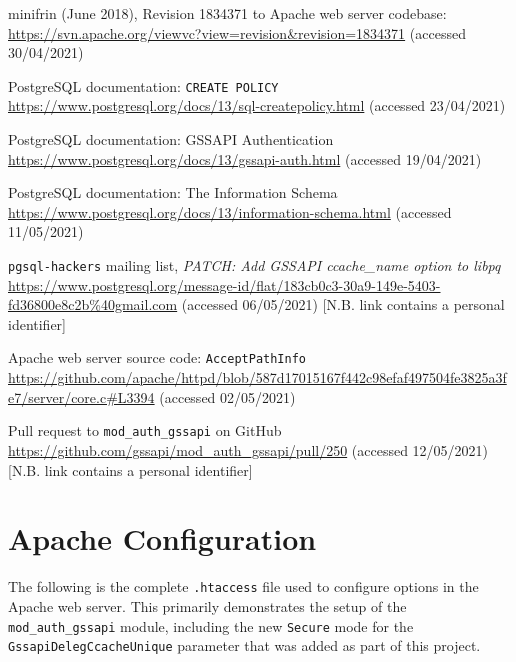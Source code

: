 \documentclass[12pt]{report}
\begin{document}
\begin{thebibliography}{99}
 minifrin (June 2018), Revision 1834371 to Apache web server codebase: \url{https://svn.apache.org/viewvc?view=revision&revision=1834371} (accessed 30/04/2021)

 PostgreSQL documentation: \texttt{CREATE POLICY} \url{https://www.postgresql.org/docs/13/sql-createpolicy.html} (accessed 23/04/2021)

 PostgreSQL documentation: GSSAPI Authentication \url{https://www.postgresql.org/docs/13/gssapi-auth.html} (accessed 19/04/2021)

 PostgreSQL documentation: The Information Schema \url{https://www.postgresql.org/docs/13/information-schema.html} (accessed 11/05/2021)

 \texttt{pgsql-hackers} mailing list, \textit{PATCH: Add GSSAPI ccache\_name option to libpq} \url{https://www.postgresql.org/message-id/flat/183cb0c3-30a9-149e-5403-fd36800e8c2b%40gmail.com} (accessed 06/05/2021) [N.B. link contains a personal identifier]

 Apache web server source code: \texttt{AcceptPathInfo} \url{https://github.com/apache/httpd/blob/587d17015167f442c98efaf497504fe3825a3fe7/server/core.c#L3394} (accessed 02/05/2021)

 Pull request to \verb+mod_auth_gssapi+ on GitHub \url{https://github.com/gssapi/mod_auth_gssapi/pull/250} (accessed 12/05/2021) [N.B. link contains a personal identifier]


\end{thebibliography}

\appendix
\chapter{Apache Configuration}
\label{sec:appendix1}
The following is the complete \verb+.htaccess+ file used to configure options in the Apache web server. This primarily demonstrates the setup of the \verb+mod_auth_gssapi+ module, including the new \texttt{Secure} mode for the \texttt{GssapiDelegCcacheUnique} parameter that was added as part of this project.
\end{document}
